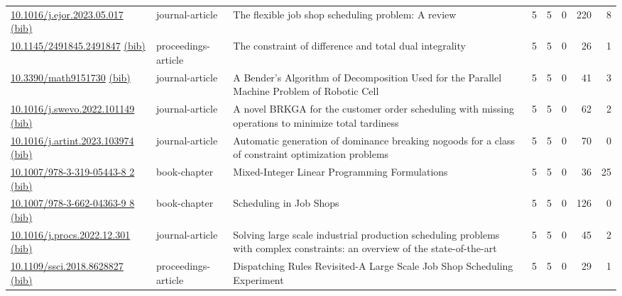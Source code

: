 {\begin{longtable}{p{5cm}lp{11cm}rrrrr}
\href{http://dx.doi.org/10.1016/j.ejor.2023.05.017}{10.1016/j.ejor.2023.05.017} \href{https://www.doi2bib.org/bib/10.1016/j.ejor.2023.05.017}{(bib)} & journal-article & The flexible job shop scheduling problem: A review & 5 & 5 & 0 & 220 & 8 \\
\href{http://dx.doi.org/10.1145/2491845.2491847}{10.1145/2491845.2491847} \href{https://www.doi2bib.org/bib/10.1145/2491845.2491847}{(bib)} & proceedings-article & The constraint of difference and total dual integrality & 5 & 5 & 0 & 26 & 1 \\
\href{http://dx.doi.org/10.3390/math9151730}{10.3390/math9151730} \href{https://www.doi2bib.org/bib/10.3390/math9151730}{(bib)} & journal-article & A Bender's Algorithm of Decomposition Used for the Parallel Machine Problem of Robotic Cell & 5 & 5 & 0 & 41 & 3 \\
\href{http://dx.doi.org/10.1016/j.swevo.2022.101149}{10.1016/j.swevo.2022.101149} \href{https://www.doi2bib.org/bib/10.1016/j.swevo.2022.101149}{(bib)} & journal-article & A novel BRKGA for the customer order scheduling with missing operations to minimize total tardiness & 5 & 5 & 0 & 62 & 2 \\
\href{http://dx.doi.org/10.1016/j.artint.2023.103974}{10.1016/j.artint.2023.103974} \href{https://www.doi2bib.org/bib/10.1016/j.artint.2023.103974}{(bib)} & journal-article & Automatic generation of dominance breaking nogoods for a class of constraint optimization problems & 5 & 5 & 0 & 70 & 0 \\
\href{http://dx.doi.org/10.1007/978-3-319-05443-8_2}{10.1007/978-3-319-05443-8 2} \href{https://www.doi2bib.org/bib/10.1007/978-3-319-05443-8_2}{(bib)} & book-chapter & Mixed-Integer Linear Programming Formulations & 5 & 5 & 0 & 36 & 25 \\
\href{http://dx.doi.org/10.1007/978-3-662-04363-9_8}{10.1007/978-3-662-04363-9 8} \href{https://www.doi2bib.org/bib/10.1007/978-3-662-04363-9_8}{(bib)} & book-chapter & Scheduling in Job Shops & 5 & 5 & 0 & 126 & 0 \\
\href{http://dx.doi.org/10.1016/j.procs.2022.12.301}{10.1016/j.procs.2022.12.301} \href{https://www.doi2bib.org/bib/10.1016/j.procs.2022.12.301}{(bib)} & journal-article & Solving large scale industrial production scheduling problems with complex constraints: an overview of the state-of-the-art & 5 & 5 & 0 & 45 & 2 \\
\href{http://dx.doi.org/10.1109/ssci.2018.8628827}{10.1109/ssci.2018.8628827} \href{https://www.doi2bib.org/bib/10.1109/ssci.2018.8628827}{(bib)} & proceedings-article & Dispatching Rules Revisited-A Large Scale Job Shop Scheduling Experiment & 5 & 5 & 0 & 29 & 1 \\

\end{longtable}}
